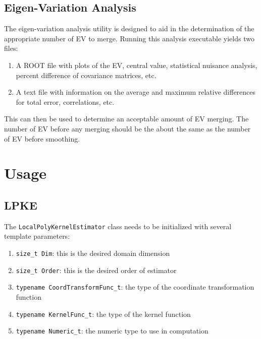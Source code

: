 \subsection{Eigen-Variation Analysis}\label{eigen-variation-analysis}

The eigen-variation analysis utility is designed to aid in the
determination of the appropriate number of EV to merge. Running this
analysis executable yields two files:

\begin{enumerate}
\def\labelenumi{\arabic{enumi}.}
\itemsep1pt\parskip0pt
\item
  A ROOT file with plots of the EV, central value, statistical nuisance
  analysis, percent difference of covariance matrices, etc.
\item
  A text file with information on the average and maximum relative
  differences for total error, correlations, etc.
\end{enumerate}

This can then be used to determine an acceptable amount of EV merging.
The number of EV before any merging should be the about the same as the
number of EV before smoothing.

\section{Usage}\label{usage}

\subsection{LPKE}\label{lpke-1}

The \texttt{LocalPolyKernelEstimator} class needs to be initialized with
several template parameters:

\begin{enumerate}
\def\labelenumi{\arabic{enumi}.}
\itemsep1pt\parskip0pt
\item
  \texttt{size\_t Dim}: this is the desired domain dimension
\item
  \texttt{size\_t Order}: this is the desired order of estimator
\item
  \texttt{typename CoordTransformFunc\_t}: the type of the coordinate
  transformation function
\item
  \texttt{typename KernelFunc\_t}: the type of the kernel function
\item
  \texttt{typename Numeric\_t}: the numeric type to use in computation
\end{enumerate}

